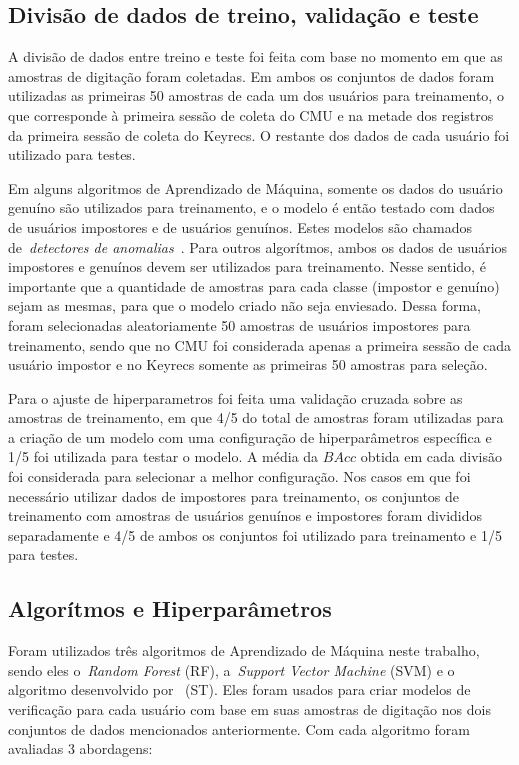 \subsection{Divisão de dados de treino, validação e teste}

A divisão de dados entre treino e teste foi feita com base no momento em que as amostras de digitação foram coletadas. Em ambos os conjuntos de dados foram utilizadas as primeiras 50 amostras de cada um dos usuários para treinamento, o que corresponde à primeira sessão de coleta do CMU e na metade dos registros da primeira sessão de coleta do Keyrecs. O restante dos dados de cada usuário foi utilizado para testes.

Em alguns algoritmos de Aprendizado de Máquina, somente os dados do usuário genuíno são utilizados para treinamento, e o modelo é então testado com dados de usuários impostores e de usuários genuínos. Estes modelos são chamados de~\textit{detectores de anomalias}~\cite{Killourhy2009}. Para outros algorítmos, ambos os dados de usuários impostores e genuínos devem ser utilizados para treinamento. Nesse sentido, é importante que a quantidade de amostras para cada classe (impostor e genuíno) sejam as mesmas, para que o modelo criado não seja enviesado. Dessa forma, foram selecionadas aleatoriamente 50 amostras de usuários impostores para treinamento, sendo que no CMU foi considerada apenas a primeira sessão de cada usuário impostor e no Keyrecs somente as primeiras 50 amostras para seleção.

Para o ajuste de hiperparametros foi feita uma validação cruzada sobre as amostras de treinamento, em que 4/5 do total de amostras foram utilizadas para a criação de um modelo com uma configuração de hiperparâmetros específica e 1/5 foi utilizada para testar o modelo. A média da $BAcc$ obtida em cada divisão foi considerada para selecionar a melhor configuração. Nos casos em que foi necessário utilizar dados de impostores para treinamento, os conjuntos de treinamento com amostras de usuários genuínos e impostores foram divididos separadamente e 4/5 de ambos os conjuntos foi utilizado para treinamento e 1/5 para testes.


\subsection{Algorítmos e Hiperparâmetros}

Foram utilizados três algoritmos de Aprendizado de Máquina neste trabalho, sendo eles o~\textit{Random Forest} (RF), a~\textit{Support Vector Machine} (SVM) e o algoritmo desenvolvido por~ (ST). Eles foram usados para criar modelos de verificação para cada usuário com base em suas amostras de digitação nos dois conjuntos de dados mencionados anteriormente. Com cada algoritmo foram avaliadas 3 abordagens:

